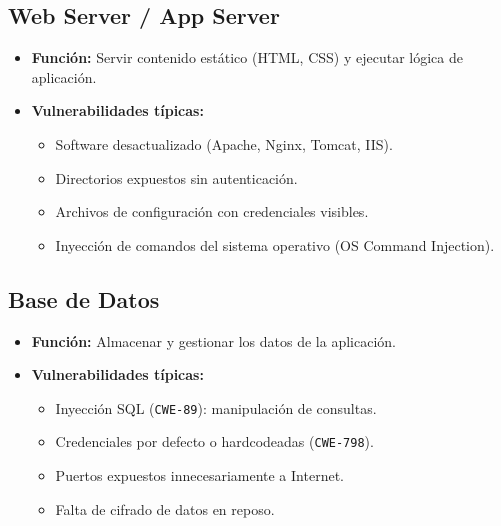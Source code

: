 \documentclass[11pt,a4paper]{article}
\begin{document}
\subsection{Web Server / App Server}
\begin{itemize}[leftmargin=*]
  \item \textbf{Función:} Servir contenido estático (HTML, CSS) y ejecutar lógica de aplicación.
  \item \textbf{Vulnerabilidades típicas:}
  \begin{itemize}
    \item Software desactualizado (Apache, Nginx, Tomcat, IIS).
    \item Directorios expuestos sin autenticación.
    \item Archivos de configuración con credenciales visibles.
    \item Inyección de comandos del sistema operativo (OS Command Injection).
  \end{itemize}
\end{itemize}

\subsection{Base de Datos}
\begin{itemize}[leftmargin=*]
  \item \textbf{Función:} Almacenar y gestionar los datos de la aplicación.
  \item \textbf{Vulnerabilidades típicas:}
  \begin{itemize}
    \item Inyección SQL (\texttt{CWE-89}): manipulación de consultas.
    \item Credenciales por defecto o hardcodeadas (\texttt{CWE-798}).
    \item Puertos expuestos innecesariamente a Internet.
    \item Falta de cifrado de datos en reposo.
  \end{itemize}
\end{itemize}
\end{document}
